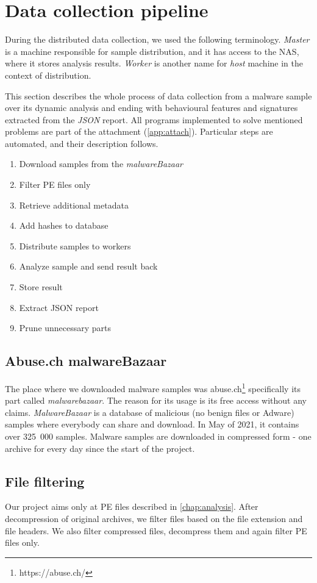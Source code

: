 \section{Data collection pipeline}
During the distributed data collection, we used the following terminology. \emph{Master} is a machine responsible for sample distribution, and it has access to the NAS, where it stores analysis results. \emph{Worker} is another name for \emph{host} machine in the context of distribution.

This section describes the whole process of data collection from a malware sample over its dynamic analysis and ending with behavioural features and signatures extracted from the \emph{JSON} report. All programs implemented to solve mentioned problems are part of the attachment (\ref{app:attach}). Particular steps are automated, and their description follows.

\begin{enumerate}
    \item Download samples from the \emph{malwareBazaar}
    \item Filter PE files only
    \item Retrieve additional metadata
    \item Add hashes to database
    \item Distribute samples to workers
    \item Analyze sample and send result back
    \item Store result
    \item Extract JSON report
    \item Prune unnecessary parts
\end{enumerate}


\subsection{Abuse.ch malwareBazaar}
The place where we downloaded malware samples was abuse.ch\footnote{https://abuse.ch/} specifically its part called \emph{malwarebazaar}. The reason for its usage is its free access without any claims. \emph{MalwareBazaar} is a database of malicious (no benign files or Adware) samples where everybody can share and download. In May of 2021, it contains over 325~000 samples. Malware samples are downloaded in compressed form - one archive for every day since the start of the project.

\subsection{File filtering}
Our project aims only at PE files described in \ref{chap:analysis}. After decompression of original archives, we filter files based on the file extension and file headers. We also filter compressed files, decompress them and again filter PE files only.

